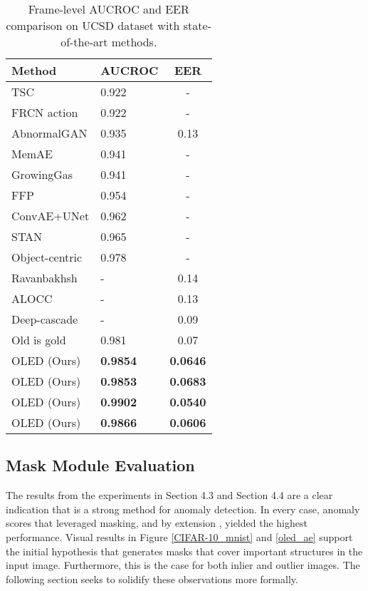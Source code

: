 \documentclass[10pt,twocolumn,letterpaper]{article}
\begin{document}
\begin{table}
\begin{center}
 \begin{tabular}{|l|l|c|}
 \hline
Method & AUCROC & EER \\ [0.5ex] 
 \hline\hline
TSC \cite{luo2017revisit_novelty}                       & 0.922 & -                  \\
FRCN action \cite{hinami2017joint_novelty}               & 0.922                  & -                  \\
AbnormalGAN \cite{ravanbakhsh2017abnormal_novelty}               & 0.935                   & 0.13               \\
MemAE \cite{gong2019memorizing} & 0.941                   & -                \\
GrowingGas \cite{sun2017online}                & 0.941   & -                \\
FFP \cite{liu2018future_novelty}     & 0.954  & -                  \\
ConvAE+UNet \cite{Nguyen_2019_ICCV}               & 0.962  & -                  \\
STAN \cite{lee2018stan}        & 0.965   &   -    \\
Object-centric \cite{ionescu2019object} &  0.978   & -                       \\ 
Ravanbakhsh \cite{ravanbakhsh2019training} & - & 0.14       \\
ALOCC \cite{sabokrou2018adversarially} & - & 0.13       \\
Deep-cascade \cite{sabokrou2017deep_novelty} & - & 0.09       \\
 Old is gold \cite{zaheer2020old} & 0.981 & 0.07       \\
 
 \hline
 OLED (Ours)   & \textbf{0.9854} & \textbf{0.0646} \\ 
 OLED (Ours)   & \textbf{0.9853} & \textbf{0.0683} \\
 OLED (Ours)   & \textbf{0.9902} & \textbf{0.0540} \\
 OLED (Ours)   & \textbf{0.9866} & \textbf{0.0606} \\

 \hline
\end{tabular}
\end{center}
\caption{Frame-level AUCROC and EER comparison on UCSD dataset with state-of-the-art methods.}
\label{ucsd_exp}
\end{table}

\subsection{Mask Module Evaluation}
The results from the experiments in Section 4.3 and Section 4.4 are a clear indication that  is a strong method for anomaly detection. In every case, anomaly scores that leveraged masking, and by extension , yielded the highest performance. Visual results in Figure \ref{CIFAR-10_mnist} and \ref{oled_ae} support the initial hypothesis that  generates masks that cover important structures in the input image. Furthermore, this is the case for both inlier and outlier images. The following section seeks to solidify these observations more formally. 
\end{document}
